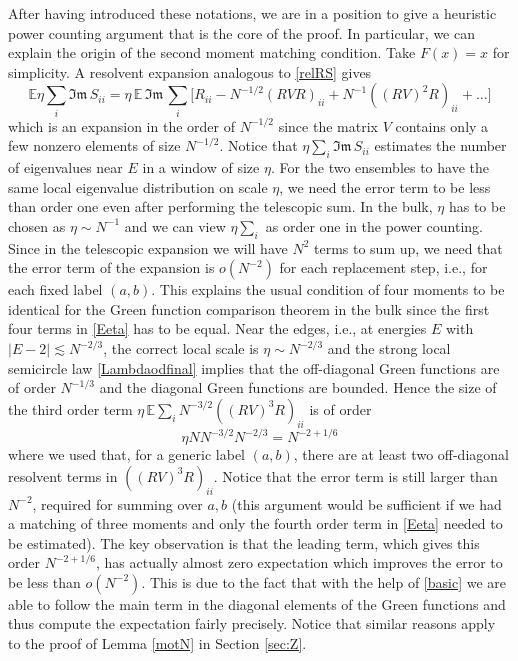 \documentclass[draft]{article}
\newcommand{\be}{\begin{equation}}
\newcommand{\ee}{\end{equation}}
\newcommand{\im}{{\mathfrak{Im} \, }}
\newcommand{\E}{{\mathbb E }}
\numberwithin{equation}{section}
\numberwithin{theorem}{section}
\numberwithin{definition}{section}
\numberwithin{remark}{section}
\begin{document}
After having introduced these notations, we are in a position to give a
heuristic power counting argument that is the core of the proof.
In particular, we can explain the origin of the second moment matching condition. 
Take $F(x)=x$ for simplicity.
A resolvent expansion  analogous to \eqref{relRS}
 gives 
\be\label{Eeta}
\E \eta \sum_i \im  S_{ii} = \eta \, \E \, \im \sum_i \Big [ R_{ii}   -   N^{-1/2}( RV R)_{ii} +  
 N^{-1} ((RV)^2 R)_{ii}+ \ldots  \Big ]
\ee
which is an expansion in the order of $N^{-1/2}$ since the matrix $V$ 
contains only a few nonzero elements of size $N^{-1/2}$.
Notice that $\eta \sum_i \im  S_{ii}$ estimates the number of eigenvalues near $E$ in a window 
of size $\eta$.  For the two ensembles to have the 
same local eigenvalue distribution on scale $\eta$,
 we need the error term to be less than order one
even after performing the telescopic sum.
 In the bulk, $\eta$ has to be chosen as $\eta \sim N^{-1}$ 
and we can view $\eta \sum_i$ as order one
 in the power counting.  Since in the telescopic expansion
we will have $N^2$ terms  to sum up, 
we need that the error term of the expansion is $o(N^{-2})$
for each replacement step, i.e., for each fixed 
label $(a, b)$. This explains the usual condition of four moments to be identical
for the Green function comparison theorem in the bulk \cite{EYY}
since the first four terms in \eqref{Eeta} has to be equal.
Near the edges, i.e., at energies $E$ 
with  $|E-2|\lesssim N^{-2/3}$,
 the correct local scale is $\eta\sim N^{-2/3}$ and
 the strong local semicircle law \eqref{Lambdaodfinal}
implies that the off-diagonal Green functions are of order 
$N^{-1/3}$  and the diagonal Green functions are bounded. 
Hence the size of the third order term 
$ \eta \, \E  \sum_i N^{-3/2}((RV)^3 R)_{ii}$ is of order 
\[
\eta N N^{-3/2} N^{-2/3}  = N^{-2 + 1/6} 
\]
where we used that,  for a generic label $(a, b)$,  there are
at least two off-diagonal resolvent terms 
in $ ((RV)^3 R)_{ii}$. Notice that the error term is still larger than $N^{-2}$, required 
for summing over $a, b$ (this argument would be sufficient if we had a matching of
three moments and only the fourth order term in \eqref{Eeta} needed to be estimated).
The key observation is that  the leading term, which gives this order $N^{-2 + 1/6} $,
has actually almost zero expectation which
 improves the error to be less than $o(N^{-2})$.  This is due 
to the fact that with the help of \eqref{basic}
we are able to follow the main term in the diagonal elements of the Green functions
and thus compute the expectation fairly precisely. Notice that similar  reasons apply to the proof of 
Lemma \ref{motN} in Section \ref{sec:Z}.
\end{document}

